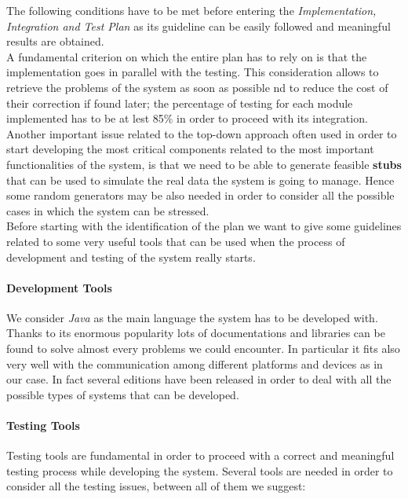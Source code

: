 		The following conditions have to be met before entering the \emph{Implementation, Integration and Test Plan} as its guideline can be easily followed and meaningful results are obtained.\\
		
		A fundamental criterion on which the entire plan has to rely on is that the implementation goes in parallel with the testing. This consideration allows to retrieve the problems of the system as soon as possible nd to reduce the cost of their correction if found later; the percentage of testing for each module implemented has to be at lest 85\% in order to proceed with its integration.\\
		
		Another important issue related to the top-down approach often used in order to start developing the most critical components related to the most important functionalities of the system, is that we need to be able to generate feasible \textbf{stubs} that can be used to simulate the real data the system is going to manage. Hence some random generators may be also needed in order to consider all the possible cases in which the system can be stressed.\\
		
		Before starting with the identification of the plan we want to give some guidelines related to some very useful tools that can be used when the process of development and testing of the system really starts.
		
		\paragraph{Development Tools} We consider \emph{Java} as the main language the system has to be developed with. Thanks to its enormous popularity lots of documentations and libraries can be found to solve almost every problems we could encounter. In particular it fits also very well with the communication among different platforms and devices as in our case. In fact several editions have been released in order to deal with all the possible types of systems that can be developed.
		
		\paragraph{Testing Tools} Testing tools are fundamental in order to proceed with a correct and meaningful testing process while developing the system. Several tools are needed in order to consider all the testing issues, between all of them we suggest:
		
